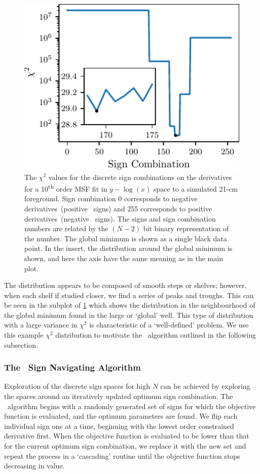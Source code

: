 \begin{figure}
    \centering
    \includegraphics{maxsmooth/figs/Figure3.pdf}
    \caption{The $\chi^2$ values for the discrete sign combinations on the derivatives for a 10\textsuperscript{th} order MSF fit in $y - \log(x)$ space to a simulated 21-cm foreground. Sign combination 0 corresponds to negative derivatives~(positive \maxsmooth~signs) and 255 corresponds to positive derivatives~(negative \maxsmooth~signs). The signs and sign combination numbers are related by the $(N-2)$ bit binary representation of the number. The global minimum is shown as a single black data point. In the insert, the distribution around the global minimum is shown, and here the axis have the same meaning as in the main plot.}
    \label{fig:ChiDistSim21}
\end{figure}

The distribution appears to be composed of smooth steps or shelves; however, when each shelf if studied closer, we find a series of peaks and troughs. This can be seen in the subplot of \cref{fig:ChiDistSim21} which shows the distribution in the neighbourhood of the global minimum found in the large or `global' well. This type of distribution with a large variance in $\chi^2$ is characteristic of a `well-defined' problem. We use this example $\chi^2$ distribution to motivate the \maxsmooth~algorithm outlined in the following subsection.

\subsubsection{The \maxsmooth~Sign Navigating Algorithm}

Exploration of the discrete sign spaces for high $N$ can be achieved by exploring the spaces around an iteratively updated optimum sign combination. The \maxsmooth~algorithm begins with a randomly generated set of signs for which the objective function is evaluated, and the optimum parameters are found. We flip each individual sign one at a time, beginning with the lowest order constrained derivative first. When the objective function is evaluated to be lower than that for the current optimum sign combination, we replace it with the new set and repeat the process in a `cascading' routine until the objective function stops decreasing in value.

